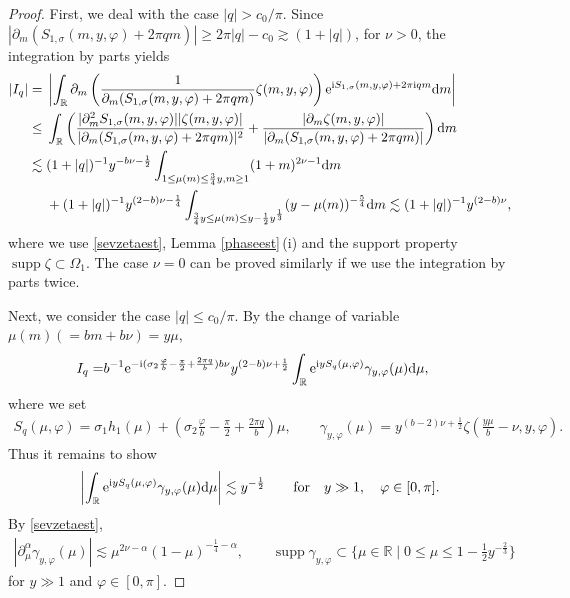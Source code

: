 \documentclass[10pt,a4paper]{amsart}
\numberwithin{equation}{section}
\def\R{\mathbb{R}}%
\DeclareMathOperator{\supp}{supp}%
\def\a{\alpha}
\def\c{\gamma}
\def\f{\varphi}
\def\m{\mu}
\def\n{\nu}
\def\s{\sigma}
\def\z{\zeta}
\def\pa{\partial}
\begin{document}
\begin{proof}
First, we deal with the case $|q|> c_0/\pi$. Since $|\pa_m(S_{1,\s}(m,y,\f)+2\pi qm)|\geq 2\pi|q|-c_0\gtrsim (1+|q|)$, for $\n>0$, the integration by parts yields
\begin{align*}
|I_{q}|={}&\left|\int_{\R}\pa_m\left(\frac{1}{\pa_m(S_{1,\s}(m,y,\f)+2\pi qm) } \z(m,y,\f)\right) {\rm e}^{{\rm i}S_{1,\s}(m,y,\f)+2\pi {\rm i}qm}{\rm d}m \right| \\
\leq{}&\int_{\R}\left(\frac{|\pa_m^2S_{1,\s}(m,y,\f)||\z(m,y,\f)|}{|\pa_m(S_{1,\s}(m,y,\f)+2\pi qm)|^2 } +\frac{|\pa_m\z(m,y,\f)|}{|\pa_m(S_{1,\s}(m,y,\f)+2\pi qm)|} \right) {\rm d}m \\
\lesssim{}& (1+|q|)^{-1} y^{-b\n-\frac{1}{2}}\int_{1\leq\m(m)\leq \frac{3}{4}y,m\geq 1}%
(1+m)^{2\n-1}{\rm d}m \\
&+(1+|q|)^{-1}y^{(2-b)\n-\frac{1}{4}}\int_{\frac{3}{4}y\leq\m(m)\leq y-\frac{1}{2}y^{\frac{1}{3}}}(y-\m(m))^{-\frac{5}{4}}{\rm d}m\lesssim (1+|q|)^{-1}y^{(2-b)\n},
\end{align*}
where we use \eqref{sevzetaest}, Lemma \ref{phaseest}\,(i) and the support property $\supp\z\subset \Omega_1$.
The case $\n=0$ can be proved similarly if we use the integration by parts twice.


Next, we consider the case $|q|\leq c_0/\pi$. By the change of variable $\m(m)(=bm+b\n)=y\m$,
\begin{align*}%
I_q=&b^{-1}{\rm e}^{-{\rm i}(\s_2\frac{\f}{b}-\frac{\pi}{2}+\frac{2\pi q}{b})b\n} y^{(2-b)\n+\frac{1}{2}}\int_{\R}{\rm e}^{{\rm i}yS_q(\m,\f) }\c_{y,\f}(\m) {\rm d}\m,
\end{align*}
where we set
\begin{align*}
S_q(\m,\f)=\s_1h_1(\m) +\left(\s_2\frac{\f}{b}-\frac{\pi}{2}+\frac{2\pi q}{b}\right)\m,\qquad \c_{y,\f}(\m)=y^{(b-2)\n+\frac{1}{2}}\z\left(\frac{y\m}{b}-\n,y,\f\right).
\end{align*}
Thus it remains to show
\begin{align}\label{I_1stphase}
\left|\int_{\R}{\rm e}^{{\rm i}yS_q(\m,\f) }\c_{y,\f}(\m) {\rm d}\m\right|\lesssim y^{-\frac{1}{2}}\qquad \text{for}\quad y\gg 1,\quad \f\in [0,\pi].
\end{align}
By \eqref{sevzetaest},
\begin{align*}%
|\pa_\m^{\a}\c_{y,\f}(\m)|\lesssim \m^{2\n-\a}(1-\m)^{-\frac{1}{4}-\a},\qquad \supp \c_{y,\f}\subset \big\{\m\in\R\mid 0\leq \m\leq 1-\frac{1}{2}y^{-\frac{2}{3}} \big\}
\end{align*}
for $y\gg 1$ and $\f\in [0,\pi]$.


\end{proof}
\end{document}
